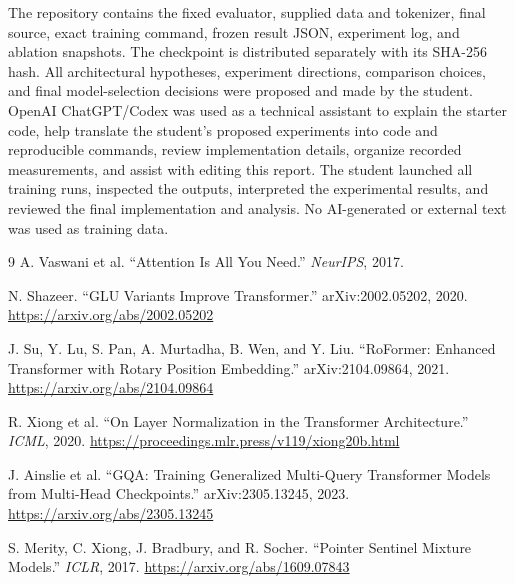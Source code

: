 \documentclass[10pt]{article}
\begin{document}
The repository contains the fixed evaluator, supplied data and tokenizer, final source, exact training command, frozen result JSON, experiment log, and ablation snapshots. The checkpoint is distributed separately with its SHA-256 hash. All architectural hypotheses, experiment directions, comparison choices, and final model-selection decisions were proposed and made by the student. OpenAI ChatGPT/Codex was used as a technical assistant to explain the starter code, help translate the student's proposed experiments into code and reproducible commands, review implementation details, organize recorded measurements, and assist with editing this report. The student launched all training runs, inspected the outputs, interpreted the experimental results, and reviewed the final implementation and analysis. No AI-generated or external text was used as training data.

\begin{thebibliography}{9}
A. Vaswani et al. ``Attention Is All You Need.'' \emph{NeurIPS}, 2017.

N. Shazeer. ``GLU Variants Improve Transformer.'' arXiv:2002.05202, 2020. \url{https://arxiv.org/abs/2002.05202}

J. Su, Y. Lu, S. Pan, A. Murtadha, B. Wen, and Y. Liu. ``RoFormer: Enhanced Transformer with Rotary Position Embedding.'' arXiv:2104.09864, 2021. \url{https://arxiv.org/abs/2104.09864}

R. Xiong et al. ``On Layer Normalization in the Transformer Architecture.'' \emph{ICML}, 2020. \url{https://proceedings.mlr.press/v119/xiong20b.html}

J. Ainslie et al. ``GQA: Training Generalized Multi-Query Transformer Models from Multi-Head Checkpoints.'' arXiv:2305.13245, 2023. \url{https://arxiv.org/abs/2305.13245}

S. Merity, C. Xiong, J. Bradbury, and R. Socher. ``Pointer Sentinel Mixture Models.'' \emph{ICLR}, 2017. \url{https://arxiv.org/abs/1609.07843}
\end{thebibliography}
\end{document}

